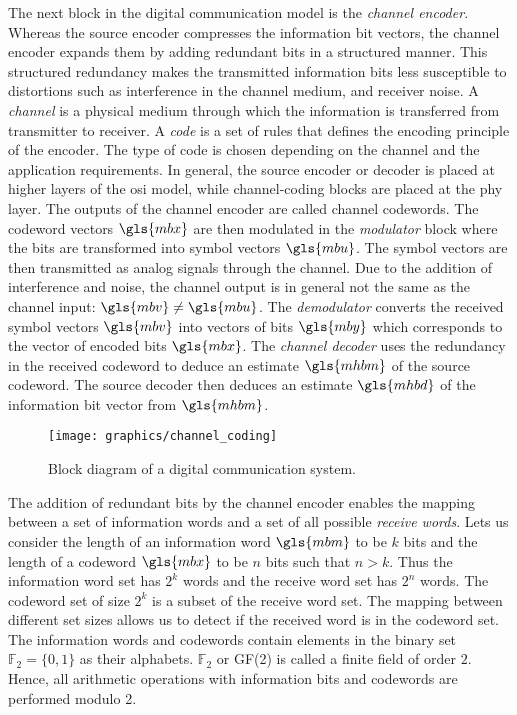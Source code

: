 The next block in the digital communication model is the \emph{channel encoder}. Whereas the source encoder compresses the information bit vectors, the channel encoder expands them by adding redundant bits in a structured manner. This structured redundancy makes the transmitted information bits less susceptible to distortions such as interference in the channel medium, and receiver noise. A \emph{channel} is a physical medium through which the information is transferred from transmitter to receiver. A \emph{code} is a set of rules that defines the encoding principle of the encoder. The type of code is chosen depending on the channel and the application requirements. In general, the source encoder or decoder is placed at higher layers of the \gls{osi} model, while channel-coding blocks are placed at the \gls{phy} layer. The outputs of the channel encoder are called channel codewords. The codeword vectors $\gls{mbx}$ are then modulated in the \emph{modulator} block where the bits are transformed into symbol vectors $\gls{mbu}$. The symbol vectors are then transmitted as analog signals through the channel. Due to the addition of interference and noise, the channel output is in general not the same as the channel input: $\gls{mbv}\neq\gls{mbu}$. The \emph{demodulator} converts the received symbol vectors $\gls{mbv}$ into vectors of bits $\gls{mby}$ which corresponds to the vector of encoded bits $\gls{mbx}$. The \emph{channel decoder} uses the redundancy in the received codeword to deduce an estimate $\gls{mhbm}$ of the source codeword. The source decoder then deduces an estimate $\gls{mhbd}$ of the information bit vector from $\gls{mhbm}$.

\begin{figure}[htbp]
  \centering
  \texttt{[image: graphics/channel\_coding]}
  \caption{Block diagram of a digital communication system.}
  \label{fig:chanCoding}
\end{figure}

The addition of redundant bits by the channel encoder enables the mapping between a set of information words and a set of all possible \emph{receive words}. Lets us consider the length of an information word $\gls{mbm}$ to be $k$ bits and the length of a codeword $\gls{mbx}$ to be $n$ bits such that $n>k$. Thus the information word set has $2^k$ words and the receive word set has $2^n$ words. The codeword set of size $2^k$ is a subset of the receive word set. The mapping between different set sizes allows us to detect if the received word is in the codeword set. The information words and codewords contain elements in the binary set $\mathbb{F}_2=\{0,1\}$ as their alphabets. $\mathbb{F}_2$ or GF(2) is called a finite field of order $2$. Hence, all arithmetic operations with information bits and codewords are performed modulo 2.

